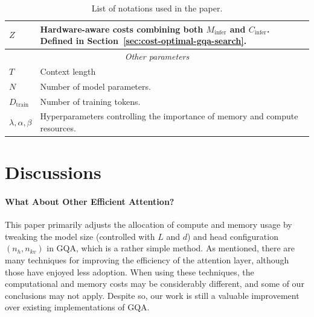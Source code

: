 \begin{table}[!t]
\begin{tabular}{l|p{5.6cm}}
        \midrule
        $Z$   & Hardware-aware costs combining both $M_\text{infer}$ and $C_\text{infer}$. Defined in Section~\ref{sec:cost-optimal-gqa-search}.\\
        \bottomrule
        \toprule
        \multicolumn{2}{c}{\textit{Other parameters}}\\
        \midrule
        $T$ & Context length \\
        \midrule
        $N$ & Number of model parameters. \\
        \midrule
        $D_\text{train}$ & Number of training tokens. \\
        \midrule
        $\lambda,\alpha,\beta$ & Hyperparameters controlling the importance of memory and compute resources.\\
        \bottomrule
    \end{tabular}
    \caption{List of notations used in the paper.}
    \label{tab:notations}
\end{table}

\section{Discussions}



\paragraph{What About Other Efficient Attention?}

This paper primarily adjusts the allocation of compute and memory usage by tweaking the model size (controlled with $L$ and $d$) and head configuration $(n_h, n_{kv})$ in GQA, which is a rather simple method. As mentioned, there are many techniques for improving the efficiency of the attention layer, although those have enjoyed less adoption. When using these techniques, the computational and memory costs may be considerably different, and some of our conclusions may not apply. Despite so, our work is still a valuable improvement over existing implementations of GQA.

